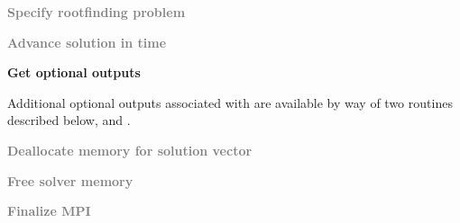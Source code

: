 {\begin{Steps}
\item
  \textcolor{gray}{\bf Specify rootfinding problem}

\item
  \textcolor{gray}{\bf Advance solution in time}

\item
  {\bf Get optional outputs}

  Additional optional outputs associated with {\idabbdpre} are available by 
  way of two routines described below,
   and .

\item
  \textcolor{gray}{\bf Deallocate memory for solution vector}

\item
  \textcolor{gray}{\bf Free solver memory}
  
\item 
  \textcolor{gray}{\bf Finalize MPI}


\end{Steps}}
